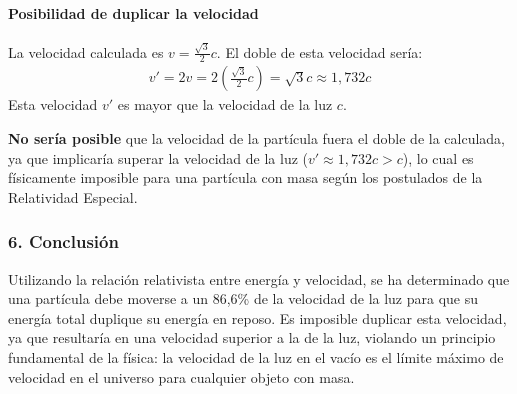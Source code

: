 \paragraph*{Posibilidad de duplicar la velocidad}
La velocidad calculada es $v = \frac{\sqrt{3}}{2}c$. El doble de esta velocidad sería:
\begin{gather}
    v' = 2v = 2 \left(\frac{\sqrt{3}}{2}c\right) = \sqrt{3}c \approx 1,732c
\end{gather}
Esta velocidad $v'$ es mayor que la velocidad de la luz $c$.
\begin{cajaresultado}
    \textbf{No sería posible} que la velocidad de la partícula fuera el doble de la calculada, ya que implicaría superar la velocidad de la luz ($v' \approx 1,732c > c$), lo cual es físicamente imposible para una partícula con masa según los postulados de la Relatividad Especial.
\end{cajaresultado}

\subsubsection*{6. Conclusión}
\begin{cajaconclusion}
Utilizando la relación relativista entre energía y velocidad, se ha determinado que una partícula debe moverse a un 86,6\% de la velocidad de la luz para que su energía total duplique su energía en reposo. Es imposible duplicar esta velocidad, ya que resultaría en una velocidad superior a la de la luz, violando un principio fundamental de la física: la velocidad de la luz en el vacío es el límite máximo de velocidad en el universo para cualquier objeto con masa.
\end{cajaconclusion}

\newpage
